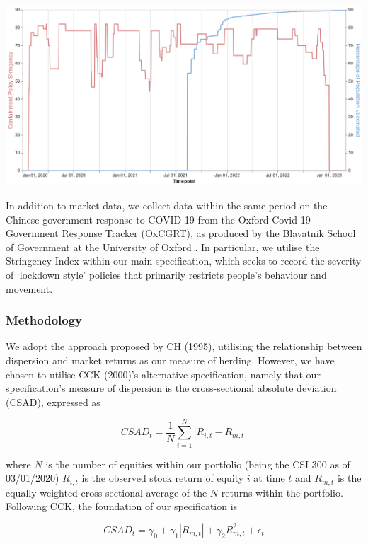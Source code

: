 \documentclass[12pt]{article}
\begin{document}
\begin{center}
    
    \includegraphics[scale=0.3]{graphics/stringency_vaccination_line.png}

\end{center}

In addition to market data, we collect data within the same period on the Chinese government response to COVID-19 from the Oxford Covid-19 Government Response Tracker (OxCGRT), as produced by the Blavatnik School of Government at the University of Oxford \citep{OxCGRT}. In particular, we utilise the Stringency Index within our main specification, which seeks to record the severity of ‘lockdown style’ policies that primarily restricts people’s behaviour and movement.

\subsubsection*{Methodology}

We adopt the approach proposed by CH (1995), utilising the relationship between dispersion and market returns as our measure of herding. However, we have chosen to utilise CCK (2000)’s alternative specification, namely that our specification’s measure of dispersion is the cross-sectional absolute deviation (CSAD), expressed as

$$
CSAD_t=\frac{1}{N}\sum^N_{i=1}|R_{i,t}-R_{m,t}|
$$

where $N$ is the number of equities within our portfolio (being the CSI 300 as of 03/01/2020) $R_{i,t}$ is the observed stock return of equity $i$ at time $t$ and $R_{m,t}$ is the equally-weighted cross-sectional average of the $N$ returns within the portfolio. Following CCK, the foundation of our specification is

$$
CSAD_t=\gamma_0+\gamma_1 |R_{m,t}|+\gamma_2 R_{m,t}^2+\epsilon_t
$$
\end{document}
